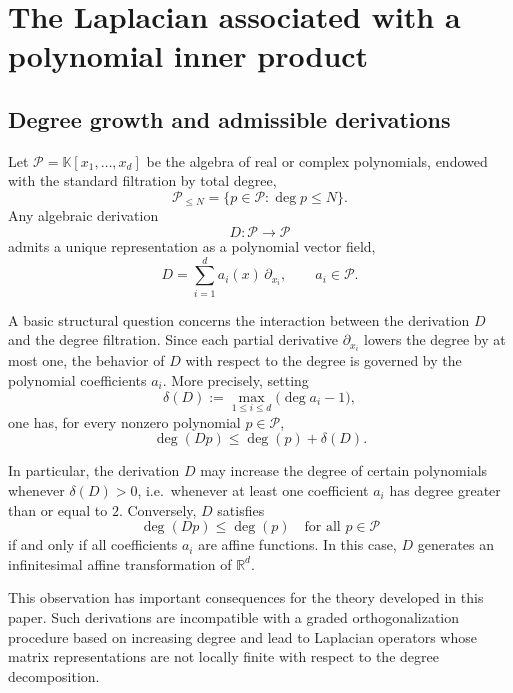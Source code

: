 \documentclass{amsart}
\numberwithin{equation}{section}
\theoremstyle{definition}
\theoremstyle{remark}
\begin{document}
\section{The Laplacian associated with a polynomial inner product}
\label{sec:laplacian}
\subsection{Degree growth and admissible derivations}
\label{subsec:degree-growth}

Let $\mathcal P=\mathbb K[x_1,\dots,x_d]$ be the algebra of real or complex polynomials,
endowed with the standard filtration by total degree,
\[
\mathcal P_{\le N}=\{p\in\mathcal P:\deg p\le N\}.
\]
Any algebraic derivation
\[
D:\mathcal P\to\mathcal P
\]
admits a unique representation as a polynomial vector field,
\begin{equation}\label{eq:poly-derivation}
D=\sum_{i=1}^d a_i(x)\,\partial_{x_i},
\qquad a_i\in\mathcal P.
\end{equation}

A basic structural question concerns the interaction between the derivation $D$ and
the degree filtration.
Since each partial derivative $\partial_{x_i}$ lowers the degree by at most one,
the behavior of $D$ with respect to the degree is governed by the polynomial coefficients
$a_i$.
More precisely, setting
\[
\delta(D):=\max_{1\le i\le d}\bigl(\deg a_i-1\bigr),
\]
one has, for every nonzero polynomial $p\in\mathcal P$,
\begin{equation}\label{eq:degree-bound}
\deg(Dp)\le \deg(p)+\delta(D).
\end{equation}

In particular, the derivation $D$ may increase the degree of certain polynomials whenever
$\delta(D)>0$, i.e.\ whenever at least one coefficient $a_i$ has degree greater than or equal
to $2$.
Conversely, $D$ satisfies
\[
\deg(Dp)\le \deg(p)\quad\text{for all }p\in\mathcal P
\]
if and only if all coefficients $a_i$ are affine functions.
In this case, $D$ generates an infinitesimal affine transformation of $\mathbb R^d$.

This observation has important consequences for the theory developed in this paper.
Such derivations are incompatible with a graded orthogonalization procedure based on
increasing degree and lead to Laplacian operators whose matrix representations are not
locally finite with respect to the degree decomposition.
\end{document}
